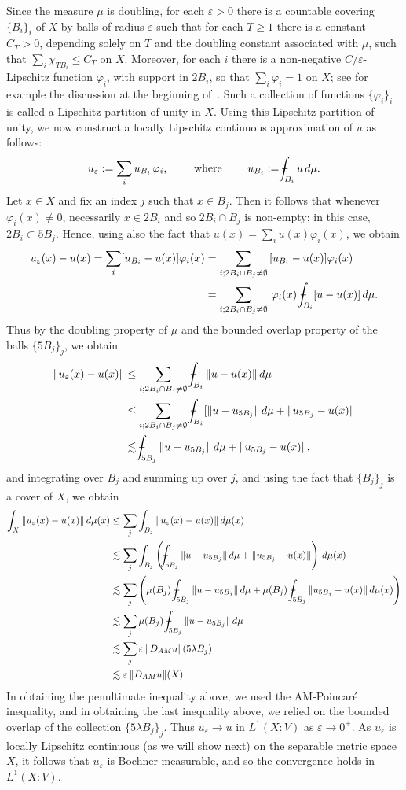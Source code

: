 \documentclass[11pt, letterpaper]{amsart} %
\newcommand*{\eps}{\varepsilon}
\newcommand*{\pip}{\varphi}
\providecommand*{\vint}[1]{\mathchoice
          {\mathop{\vrule width 5pt height 3 pt depth -2.5pt
                  \kern -9pt \kern 1pt\intop}\nolimits_{\kern -5pt{#1}}}
          {\mathop{\vrule width 5pt height 3 pt depth -2.6pt
                  \kern -6pt \intop}\nolimits_{\kern -3pt{#1}}}
          {\mathop{\vrule width 5pt height 3 pt depth -2.6pt
                  \kern -6pt \intop}\nolimits_{\kern -3pt{#1}}}
          {\mathop{\vrule width 5pt height 3 pt depth -2.6pt
                  \kern -6pt \intop}\nolimits_{\kern -3pt{#1}}}}
\numberwithin{equation}{section}
\theoremstyle{plain}
\theoremstyle{definition}
\begin{document}
{Since the measure $\mu$ is doubling, for each $\eps>0$ there is a countable covering $\{B_i\}_i$ of $X$ by balls of radius $\eps$
such that for each $T\ge1$ there is a constant $C_T>0$, depending solely on $T$ and the doubling constant associated
with $\mu$, such that $\sum_i\chi_{TB_i}\le C_T$ on $X$. Moreover, for each $i$ there is a non-negative $C/\eps$-Lipschitz
function $\pip_i$, with support in $2B_i$, so that $\sum_i\pip_i=1$ on $X$; see for example the discussion
at the beginning of~\cite[Section~9.2]{HKSTbook}. Such a collection of functions $\{\pip_i\}_i$ is called a Lipschitz
partition of unity in $X$. Using this Lipschitz partition of unity, we now construct a locally Lipschitz continuous approximation
of $u$ as follows:
\[
u_\eps:=\sum_i u_{B_i}\, \pip_i,\qquad \text{ where }\qquad u_{B_i}:=\vint{B_i}u\, d\mu.
\]
Let $x\in X$ and fix an index $j$ such that $x\in B_j$. Then it follows that whenever $\pip_i(x)\ne 0$, necessarily $x\in 2B_i$ and
so $2B_i\cap B_j$ is non-empty; in this case, $2B_i\subset 5B_j$. Hence, using also the fact that
$u(x)=\sum_iu(x)\pip_i(x)$, we obtain
\begin{align*}
u_\eps(x)-u(x)=\sum_i[u_{B_i}-u(x)]\pip_i(x)
&=\sum_{i; 2B_i\cap B_j\ne\emptyset}\, [u_{B_i}-u(x)]\pip_i(x)\\
&=\sum_{i; 2B_i\cap B_j\ne\emptyset}\, \pip_i(x)\, \vint{B_i}[u-u(x)]\, d\mu.
\end{align*}
Thus by the doubling property of $\mu$ and the bounded overlap property of the balls $\{5B_j\}_j$, we obtain
\begin{align*}
\|u_\eps(x)-u(x)\|&\le \sum_{i; 2B_i\cap B_j\ne\emptyset}\, \vint{B_i}\|u-u(x)\|\, d\mu\\
 &\le \sum_{i; 2B_i\cap B_j\ne\emptyset}\, \vint{B_i}[\|u-u_{5B_j}\|\, d\mu+\|u_{5B_j}-u(x)\|\\
 &\lesssim \vint{5B_j}\|u-u_{5B_j}\|\, d\mu+\|u_{5B_j}-u(x)\|,
\end{align*}
and integrating over $B_j$ and summing up over $j$, and using the fact that $\{B_j\}_j$ is a cover of $X$, we obtain
\begin{align*}
\int_X\|u_\eps(x)-u(x)\|\, d\mu(x)&\le \sum_j\int_{B_j}\|u_\eps(x)-u(x)\|\, d\mu(x)\\
&\lesssim \sum_j\int_{B_j} \left(\vint{5B_j}\|u-u_{5B_j}\|\, d\mu+\|u_{5B_j}-u(x)\|\right)\, d\mu(x)\\
&\lesssim\sum_j\left(\mu(B_j)\, \vint{5B_j}\|u-u_{5B_j}\|\, d\mu+\mu(B_j)\, \vint{5B_j}\|u_{5B_j}-u(x)\|\, d\mu(x)\right)\\
&\lesssim\sum_j\mu(B_j)\, \vint{5B_j}\|u-u_{5B_j}\|\, d\mu\\
&\lesssim\sum_j \eps\, \Vert D_{AM}u\Vert(5\lambda B_j)\\
&\lesssim \eps\, \Vert D_{AM}u\Vert(X).
\end{align*}
In obtaining the penultimate inequality above, we used the AM-Poincar\'e inequality, and in obtaining the last inequality
above, we relied on the bounded overlap of the collection $\{5\lambda B_j\}_j$. Thus $u_\eps\to u$ in $L^1(X:V)$
as $\eps\to 0^+$. As $u_\eps$ is locally Lipschitz continuous (as we will show next) on the separable metric space $X$,
it follows that $u_\eps$ is Bochner measurable, and so the convergence holds in $L^1(X:V)$.

}
\end{document}
